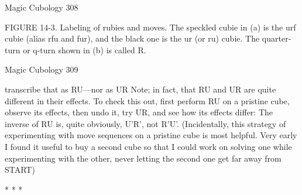 Magic Cubology                                                                        308

FIGURE 14-3. Labeling of rubies and moves. The speckled cubie in (a) is the urf
cubie (alias rfu and fur), and the black one is the ur (or ru) cubie. The quarter-turn or
q-turn shown in (b) is called R.




Magic Cubology                                                                       309

transcribe that as RU—nor as UR Note; in fact, that RU and UR are quite different in
their effects. To check this out, first perform RU on a pristine cube, observe its
effects, then undo it, try UR, and see how its effects differ: The inverse of RU is, quite
obviously, U'R', not R'U'. (Incidentally, this strategy of experimenting with move
sequences on a pristine cube is most helpful. Very early I found it useful to buy a
second cube so that I could work on solving one while experimenting with the other,
never letting the second one get far away from START)

                                        *   *   *

